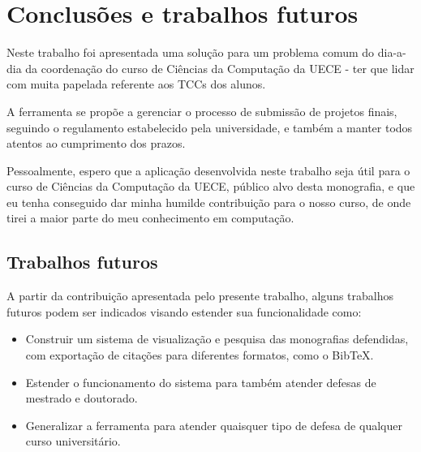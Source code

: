 \chapter{Conclusões e trabalhos futuros}
\label{cha:conclusoes}

Neste trabalho foi apresentada uma solução para um problema comum do dia-a-dia
da coordenação do curso de Ciências da Computação da UECE - ter que lidar com
muita papelada referente aos TCCs dos alunos.

A ferramenta se propõe a gerenciar o processo de submissão de projetos finais, seguindo
o regulamento estabelecido pela universidade, e também a manter todos atentos ao cumprimento
dos prazos.

Pessoalmente, espero que a aplicação desenvolvida neste trabalho seja útil
para o curso de Ciências da Computação da UECE, público alvo desta monografia, 
e que eu tenha conseguido dar minha humilde contribuição para o nosso curso,
de onde tirei a maior parte do meu conhecimento em computação.

\section{Trabalhos futuros}
A partir da contribuição apresentada pelo presente trabalho, alguns
trabalhos futuros podem ser indicados visando estender sua funcionalidade como:

\begin{itemize}
\item Construir um sistema de visualização e pesquisa das monografias defendidas, 
com exportação de citações para diferentes formatos, como o {\sc Bib}\TeX.
\item Estender o funcionamento do sistema para também atender defesas de mestrado e doutorado.
\item Generalizar a ferramenta para atender quaisquer tipo de defesa de qualquer curso universitário.
\end{itemize}
